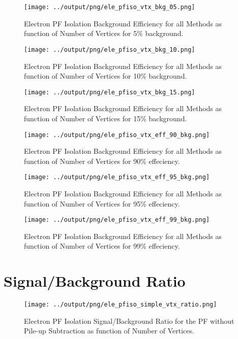 \documentclass[11pt]{book}
\begin{document}
\begin{figure}[htb]
\centering
\texttt{[image: ../output/png/ele\_pfiso\_vtx\_bkg\_05.png]}
\caption{Electron PF Isolation Background Efficiency for all Methods as function of Number of Vertices for 5\% background.}
\label{fig:ele_pfiso_vtx_bkg_05}
\end{figure}

\begin{figure}[htb]
\centering
\texttt{[image: ../output/png/ele\_pfiso\_vtx\_bkg\_10.png]}
\caption{Electron PF Isolation Background Efficiency for all Methods as function of Number of Vertices for 10\% background.}
\label{fig:ele_pfiso_vtx_bkg_10}
\end{figure}

\begin{figure}[htb]
\centering
\texttt{[image: ../output/png/ele\_pfiso\_vtx\_bkg\_15.png]}
\caption{Electron PF Isolation Background Efficiency for all Methods as function of Number of Vertices for 15\% background.}
\label{fig:ele_pfiso_vtx_bkg_15}
\end{figure}

\begin{figure}[htb]
\centering
\texttt{[image: ../output/png/ele\_pfiso\_vtx\_eff\_90\_bkg.png]}
\caption{Electron PF Isolation Background Efficiency for all Methods as function of Number of Vertices for 90\% effeciency.}
\label{fig:ele_pfiso_vtx_eff_90_bkg}
\end{figure}

\begin{figure}[htb]
\centering
\texttt{[image: ../output/png/ele\_pfiso\_vtx\_eff\_95\_bkg.png]}
\caption{Electron PF Isolation Background Efficiency for all Methods as function of Number of Vertices for 95\% effeciency.}
\label{fig:ele_pfiso_vtx_eff_95_bkg}
\end{figure}

\begin{figure}[htb]
\centering
\texttt{[image: ../output/png/ele\_pfiso\_vtx\_eff\_99\_bkg.png]}
\caption{Electron PF Isolation Background Efficiency for all Methods as function of Number of Vertices for 99\% effeciency.}
\label{fig:ele_pfiso_vtx_eff_99_bkg}
\end{figure}
\clearpage

\chapter{Signal/Background Ratio}
\begin{figure}[htb]
\centering
\texttt{[image: ../output/png/ele\_pfiso\_simple\_vtx\_ratio.png]}
\caption{Electron PF Isolation Signal/Background Ratio for the PF without Pile-up Subtraction as function of Number of Vertices.}
\label{fig:ele_pfiso_vtx_ratio_simple}
\end{figure}
\end{document}
